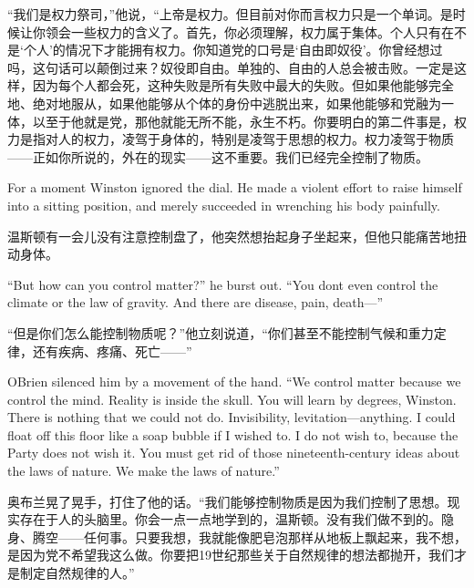 \begin{paracol}{2}
``我们是权力祭司，''他说，``上帝是权力。但目前对你而言权力只是一个单词。是时候让你领会一些权力的含义了。首先，你必须理解，权力属于集体。个人只有在不是`个人'的情况下才能拥有权力。你知道党的口号是`自由即奴役'。你曾经想过吗，这句话可以颠倒过来？奴役即自由。单独的、自由的人总会被击败。一定是这样，因为每个人都会死，这种失败是所有失败中最大的失败。但如果他能够完全地、绝对地服从，如果他能够从个体的身份中逃脱出来，如果他能够和党融为一体，以至于他就是党，那他就能无所不能，永生不朽。你要明白的第二件事是，权力是指对人的权力，凌驾于身体的，特别是凌驾于思想的权力。权力凌驾于物质——正如你所说的，外在的现实——这不重要。我们已经完全控制了物质。

\switchcolumn*

For a moment Winston ignored the dial. He made a violent effort to raise
himself into a sitting position, and merely succeeded in wrenching his
body painfully.

\switchcolumn

温斯顿有一会儿没有注意控制盘了，他突然想抬起身子坐起来，但他只能痛苦地扭动身体。

\switchcolumn*

``But how can you control matter?'' he burst out. ``You
don\textquotesingle t even control the climate or the law of gravity.
And there are disease, pain, death---''

\switchcolumn

``但是你们怎么能控制物质呢？''他立刻说道，``你们甚至不能控制气候和重力定律，还有疾病、疼痛、死亡——''

\switchcolumn*

O\textquotesingle Brien silenced him by a movement of the hand. ``We
control matter because we control the mind. Reality is inside the skull.
You will learn by degrees, Winston. There is nothing that we could not
do. Invisibility, levitation---anything. I could float off this floor
like a soap bubble if I wished to. I do not wish to, because the Party
does not wish it. You must get rid of those nineteenth-century ideas
about the laws of nature. We make the laws of nature.''

\switchcolumn

奥布兰晃了晃手，打住了他的话。``我们能够控制物质是因为我们控制了思想。现实存在于人的头脑里。你会一点一点地学到的，温斯顿。没有我们做不到的。隐身、腾空——任何事。只要我想，我就能像肥皂泡那样从地板上飘起来，我不想，是因为党不希望我这么做。你要把19世纪那些关于自然规律的想法都抛开，我们才是制定自然规律的人。''

\switchcolumn*


\end{paracol}
